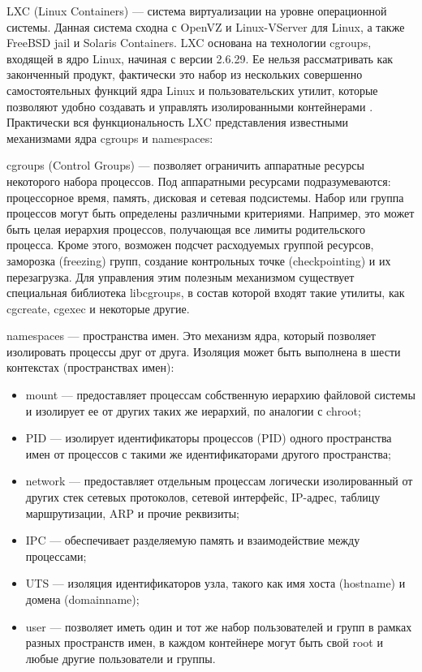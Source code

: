 LXC (Linux Containers) --- система виртуализации на уровне операционной системы.
Данная система сходна с OpenVZ и Linux-VServer для Linux, а также FreeBSD jail и Solaris Containers.
LXC основана на технологии cgroups, входящей в ядро Linux, начиная с версии 2.6.29.
Ее нельзя рассматривать как законченный продукт, фактически это набор из нескольких совершенно самостоятельных функций ядра Linux и пользовательских утилит, которые позволяют удобно создавать и управлять изолированными контейнерами \cite{lxc}.
Практически вся функциональность LXC представления известными механизмами ядра cgroups и namespaces:

cgroups (Control Groups) --- позволяет ограничить аппаратные ресурсы некоторого набора процессов.
Под аппаратными ресурсами подразумеваются: процессорное время, память, дисковая и сетевая подсистемы.
Набор или группа процессов могут быть определены различными критериями.
Например, это может быть целая иерархия процессов, получающая все лимиты родительского процесса.
Кроме этого, возможен подсчет расходуемых группой ресурсов, заморозка (freezing) групп, создание контрольных точке (checkpointing) и их перезагрузка.
Для управления этим полезным механизмом существует специальная библиотека libcgroups, в состав которой входят такие утилиты, как cgcreate, cgexec и некоторые другие.

namespaces --- пространства имен.
Это механизм ядра, который позволяет изолировать процессы друг от друга.
Изоляция может быть выполнена в шести контекстах (пространствах имен):
\begin{itemize}
  \item mount --- предоставляет процессам собственную иерархию файловой системы и изолирует ее от других таких же иерархий, по аналогии с chroot;
  \item PID --- изолирует идентификаторы процессов (PID) одного пространства имен от процессов с такими же идентификаторами другого пространства;
  \item network --- предоставляет отдельным процессам логически изолированный от других стек сетевых протоколов, сетевой интерфейс, IP-адрес, таблицу маршрутизации, ARP и прочие реквизиты;
  \item IPC --- обеспечивает разделяемую память и взаимодействие между процессами;
  \item UTS --- изоляция идентификаторов узла, такого как имя хоста (hostname) и домена (domainname);
  \item user --- позволяет иметь один и тот же набор пользователей и групп в рамках разных пространств имен, в каждом контейнере могут быть свой root и любые другие пользователи и группы.
\end{itemize}

